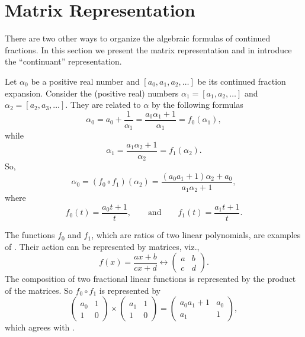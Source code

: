\section{Matrix Representation}
\label{CF:Matrix:Sec}


There are two other ways to organize the algebraic formulas of
continued fractions.  In this section we present the matrix
representation and in  introduce the
``continuant'' representation.

Let $\alpha_0$ be a positive real number and $[a_0, a_1, a_2, \ldots]$
be its continued fraction expansion.  Consider the (positive real)
numbers $\alpha_1 = [a_1, a_2, \ldots]$ and $\alpha_2 = [a_2, a_3,
\ldots].$ They are related to $\alpha$ by the following formulas
\[
\alpha_0 = a_0 + \frac{1}{\alpha_1} =\frac{a_0 \alpha_1 + 1}{\alpha_1}
   = f_0 (\alpha_1),
\]
while
\[
\alpha_1 = \frac{a_1 \alpha_2 + 1}{\alpha_2} = f_1(\alpha_2).
\]
So,
\begin{equation}\label{CF:2Step:Eq}
\alpha_0 = (f_0 \circ f_1) (\alpha_2) 
  = \frac{(a_0 a_1 + 1) \alpha_2 + a_0}{a_1 \alpha_2 + 1},
\end{equation}
where
\[
f_0(t) = \frac{a_0 t +1}{t}, \qquad\mbox{and}\qquad
 f_1(t) = \frac{a_1 t +1}{t}.
\]

The functions $f_0$ and $f_1$, which are ratios of two linear
polynomials, are examples of .
Their action can be represented by matrices, viz.,
\[
f (x) = \frac{a x + b}{c x + d} \longleftrightarrow 
\begin{pmatrix} a & b \\ c & d \end{pmatrix}.
\]
The composition of two fractional linear functions is represented by
the product of the matrices. So $f_0 \circ f_1$ is represented by 
\[
\begin{pmatrix}a_0& 1 \\ 1 &0\end{pmatrix} \times
\begin{pmatrix}a_1& 1 \\ 1 &0\end{pmatrix}
=
\begin{pmatrix}a_0 a_1 + 1& a_0 \\ a_1 & 1\end{pmatrix},
\]
which agrees with .

